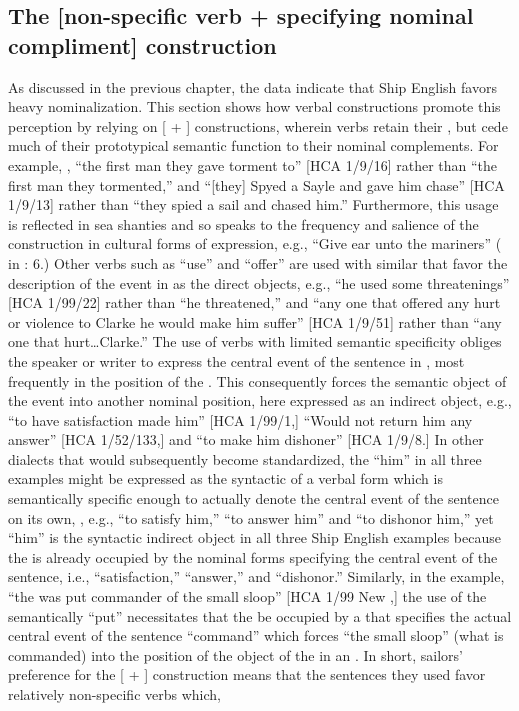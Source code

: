 \subsection{{The} {[non-specific} {verb} {+} {specifying} {nominal} {compliment]} {construction}}%

As discussed in the previous chapter, the data indicate that Ship English favors heavy nominalization. This section shows how verbal constructions promote this perception by relying on [ + ] constructions, wherein verbs retain their , but cede much of their prototypical semantic function to their nominal complements.  For example, , “the first man they gave torment to” [HCA 1/9/16] rather than “the first man they tormented,” and “[they] Spyed a Sayle and gave him chase” [HCA 1/9/13] rather than “they spied a sail and chased him.” Furthermore, this usage is reflected in sea shanties and so speaks to the frequency and salience of the construction in cultural forms of expression, e.g., “Give ear unto the mariners” ( in \citealt{Hugill1969}: 6.) Other verbs such as “use” and “offer” are used with similar  that favor the description of the event in  as the direct objects, e.g., “he used some threatenings” [HCA 1/99/22] rather than “he threatened,” and “any one that offered any hurt or violence to Clarke he would make him suffer” [HCA 1/9/51] rather than “any one that hurt…Clarke.” The use of verbs with limited semantic specificity obliges the speaker or writer to express the central event of the sentence in , most frequently in the position of the . This consequently forces the semantic object of the event into another nominal position, here expressed as an indirect object, e.g., “to have satisfaction made him” [HCA 1/99/1,] “Would not return him any answer” [HCA 1/52/133,] and “to make him dishoner” [HCA 1/9/8.] In other dialects that would subsequently become standardized, the  “him” in all three examples might be expressed as the syntactic  of a verbal form which is semantically specific enough to actually denote the central event of the sentence on its own, , e.g., “to satisfy him,” “to answer him” and “to dishonor him,” yet  “him” is the syntactic indirect object in all three Ship English examples because the  is already occupied by the nominal forms specifying the central event of the sentence, i.e., “satisfaction,” “answer,” and “dishonor.” Similarly, in the example, “the  was put commander of the small sloop” [HCA 1/99 New \citealt{Providence1722},] the use of the semantically  “put” necessitates that the  be occupied by a  that specifies the actual central event of the sentence “command” which forces “the small sloop” (what is commanded) into the position of the object of the  in an . In short, sailors’ preference for the [ + ] construction means that the sentences they used favor relatively non-specific verbs which, 